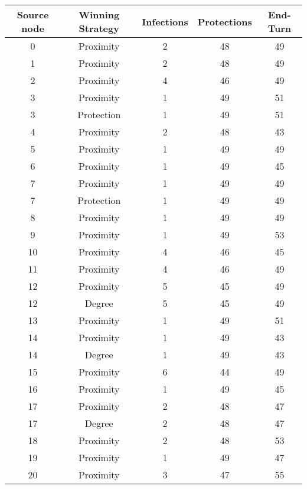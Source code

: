 \documentclass[results.tex]{subfiles}
\begin{document}
\begin{center}
  \begin{tabular}{| c || c | c | c | c |}
    \hline
    {\bfseries Source node} & {\bfseries Winning Strategy} & {\bfseries Infections} & {\bfseries Protections} & {\bfseries End-Turn} \\  %
    \hline\hline
    0 & Proximity & 2 & 48 & 49 \\ 
    \hline
    1 & Proximity & 2 & 48 & 49 \\ 
    \hline
    2 & Proximity & 4 & 46 & 49 \\ 
    \hline
    3 & Proximity & 1 & 49 & 51 \\ 
    \hline
    3 & Protection & 1 & 49 & 51 \\ 
    \hline
    4 & Proximity & 2 & 48 & 43 \\ 
    \hline
    5 & Proximity & 1 & 49 & 49 \\ 
    \hline
    6 & Proximity & 1 & 49 & 45 \\ 
    \hline
    7 & Proximity & 1 & 49 & 49 \\ 
    \hline
    7 & Protection & 1 & 49 & 49 \\ 
    \hline
    8 & Proximity & 1 & 49 & 49 \\ 
    \hline
    9 & Proximity & 1 & 49 & 53 \\ 
    \hline
    10 & Proximity & 4 & 46 & 45 \\ 
    \hline
    11 & Proximity & 4 & 46 & 49 \\ 
    \hline
    12 & Proximity & 5 & 45 & 49 \\ 
    \hline
    12 & Degree & 5 & 45 & 49 \\ 
    \hline
    13 & Proximity & 1 & 49 & 51 \\ 
    \hline
    14 & Proximity & 1 & 49 & 43 \\ 
    \hline
    14 & Degree & 1 & 49 & 43 \\ 
    \hline
    15 & Proximity & 6 & 44 & 49 \\ 
    \hline
    16 & Proximity & 1 & 49 & 45 \\ 
    \hline
    17 & Proximity & 2 & 48 & 47 \\ 
    \hline
    17 & Degree & 2 & 48 & 47 \\ 
    \hline
    18 & Proximity & 2 & 48 & 53 \\ 
    \hline
    19 & Proximity & 1 & 49 & 47 \\ 
    \hline
    20 & Proximity & 3 & 47 & 55 \\ 

\end{tabular}
\end{center}
\end{document}
